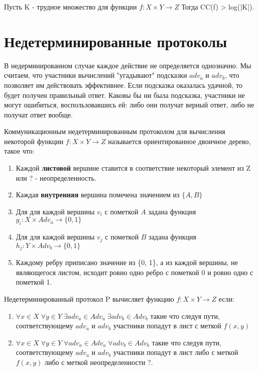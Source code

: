 \documentclass[12pt]{article}
\begin{document}
\begin{Th}
    Пусть K - трудное множество для функции $f \colon X \times Y \rightarrow Z$
    Тогда CC(f) > log(|K|).
\end{Th}


\section{Недетерминированные протоколы}
В недерминированном случае каждое действие не определяется однозначно. Мы считаем, что участники вычислений "угадывают" подсказки $adv_a$ и $adv_b$, что позволяет им действовать эффективнее.
Если подсказка оказалась удачной, то будет получен правильный ответ.
Каковы бы ни была подсказка, участники не могут ошибиться,
воспользовавшись ей: либо они получат верный ответ, либо не получат ответ вообще.

\begin{Def}
Коммуникационным недетерминированным протоколом для вычисления некоторой функции
$ f \colon X \times Y \rightarrow Z $
называется ориентированное двоичное дерево, такое что:
\begin{enumerate}
    \item
    Каждой \textbf{листовой} вершине ставится в соответствие некоторый элемент из Z или ? - неопределенность.
    \item
    Каждая \textbf{внутренняя} вершина помечена значением из $ \{ A, B \} $
    \item
    Для для каждой вершины $v_i$ с пометкой $A$ задана функция \linebreak
    $ g_i \colon X \times Adv_a \rightarrow \{0, 1\} $
    \item
    Для для каждой вершины $v_j$ с пометкой $B$ задана функция \linebreak
    $ h_j \colon Y \times Adv_b \rightarrow \{0, 1\} $
    \item
    Каждому ребру приписано значение из \{0, 1\}, а из каждой вершины, не являющегося листом, исходит ровно одно ребро с пометкой 0 и ровно одно с пометкой 1.
\end{enumerate}
\end{Def}

\begin{Def}
    Недетерминированный протокол P вычисляет функцию
    $ f \colon X \times Y \rightarrow Z $
    если:
    \begin{enumerate}
        \item
        $\forall x \in X \; \forall y \in Y \;
         \exists adv_a \in Adv_a \; \exists adv_b \in Adv_b$
        такие что следуя пути, соответствующему $adv_a$ и $adv_b$
        участники попадут в лист с меткой $f(x,y)$
        \item
        $\forall x \in X \; \forall y \in Y \;
         \forall adv_a \in Adv_a \; \forall adv_b \in Adv_b$
        такие что следуя пути, соответствующему $adv_a$ и $adv_b$
        участники попадут в лист либо с меткой $f(x,y)$ либо с меткой неопределенности ?.
    \end{enumerate}
\end{Def}
\end{document}
